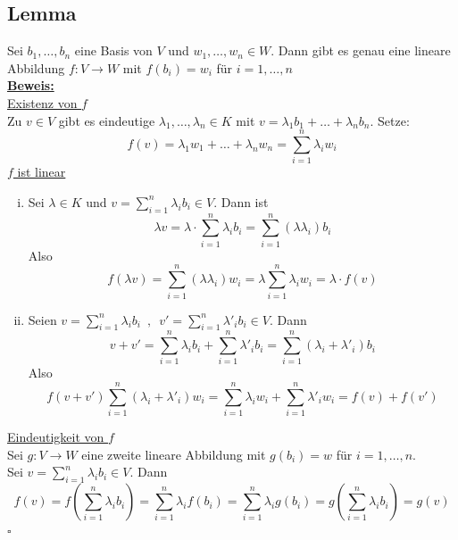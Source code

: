 \subsection{Lemma} %
\label{sub:lemma}
Sei $b_1, \ldots , b_n$ eine Basis von $V$ und $w_1 , \ldots , w_n \in W$. Dann gibt es genau eine lineare Abbildung $f: V \to W$
mit $f(b_i)=w_i$ für $i= 1, \ldots ,n$ \\
\newpage 
\underline{\textbf{Beweis:}}
\vspace{10pt} \\
\underline{Existenz von $f$} \\
Zu $v \in V$ gibt es eindeutige $\lambda_1 , \ldots , \lambda_n \in K$ mit $v= \lambda_1 b_1 + \ldots + \lambda_n b_n$. Setze:
\[
	f(v)= \lambda_1 w_1 +\ldots + \lambda_n w_n = \sum\limits_{i=1}^{n} \lambda_i w_i
\]
\underline{$f$ ist linear}
\begin{enumerate}[(i)]
	\item Sei $\lambda \in K$ und $v= \sum\limits_{i=1}^{n} \lambda_i b_i \in V$. Dann ist 
	\[
		\lambda v = \lambda \cdot \sum\limits_{i=1}^{n} \lambda_i b_i = \sum\limits_{i=1}^{n} (\lambda \lambda_i) b_i
	\]
	Also
	\[
		f(\lambda v)= \sum\limits_{i=1}^{n} (\lambda \lambda_i) w_i = \lambda \sum\limits_{i=1}^{n} \lambda_i w_i = \lambda \cdot f(v)
	\]
	\item Seien $v= \sum\limits_{i=1}^{n} \lambda_i b_i \enspace, \enspace v' = \sum\limits_{i=1}^{n} \lambda'_i b_i \in V$. Dann
	\[
		v+v' = \sum\limits_{i=1}^{n} \lambda_i b_i + \sum\limits_{i=1}^{n} \lambda'_i b_i = \sum\limits_{i=1}^{n} (\lambda_i +\lambda'_i) b_i
	\]
	Also
	\[
		f(v+v') \sum\limits_{i=1}^{n} (\lambda_i +\lambda'_i) w_i = \sum\limits_{i=1}^{n} \lambda_i w_i + \sum\limits_{i=1}^{n} \lambda'_i w_i
		= f(v)+ f(v')
	\]
\end{enumerate}
\underline{Eindeutigkeit von $f$} \\
Sei $g: V \to W$ eine zweite lineare Abbildung mit $g(b_i)= w$ für $i=1, \ldots , n$. \\
Sei $v= \sum\limits_{i=1}^{n} \lambda_i b_i \in V$. Dann
\[
	f(v)= f \left(\sum\limits_{i=1}^{n} \lambda_i b_i\right) = \sum\limits_{i=1}^{n} \lambda_i f(b_i) = \sum\limits_{i=1}^{n} \lambda_i g(b_i) 
	= g \left(\sum\limits_{i=1}^{n} \lambda_i b_i \right) = g(v)
\]
\hfill $\square$

